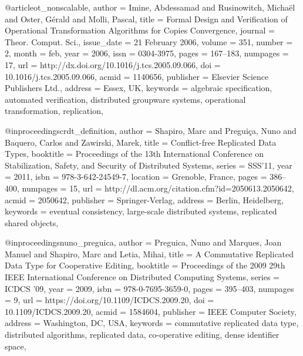 @article{ot_nonscalable,
 author = {Imine, Abdessamad and Rusinowitch, Micha\"{e}l and Oster, G{\'e}rald and Molli, Pascal},
 title = {Formal Design and Verification of Operational Transformation Algorithms for Copies Convergence},
 journal = {Theor. Comput. Sci.},
 issue_date = {21 February 2006},
 volume = {351},
 number = {2},
 month = feb,
 year = {2006},
 issn = {0304-3975},
 pages = {167--183},
 numpages = {17},
 url = {http://dx.doi.org/10.1016/j.tcs.2005.09.066},
 doi = {10.1016/j.tcs.2005.09.066},
 acmid = {1140656},
 publisher = {Elsevier Science Publishers Ltd.},
 address = {Essex, UK},
 keywords = {algebraic specification, automated verification, distributed groupware systems, operational transformation, replication},
}

@inproceedings{crdt_definition,
 author = {Shapiro, Marc and Pregui\c{c}a, Nuno and Baquero, Carlos and Zawirski, Marek},
 title = {Conflict-free Replicated Data Types},
 booktitle = {Proceedings of the 13th International Conference on Stabilization, Safety, and Security of Distributed Systems},
 series = {SSS'11},
 year = {2011},
 isbn = {978-3-642-24549-7},
 location = {Grenoble, France},
 pages = {386--400},
 numpages = {15},
 url = {http://dl.acm.org/citation.cfm?id=2050613.2050642},
 acmid = {2050642},
 publisher = {Springer-Verlag},
 address = {Berlin, Heidelberg},
 keywords = {eventual consistency, large-scale distributed systems, replicated shared objects},
} 

@inproceedings{nuno_preguica,
 author = {Preguica, Nuno and Marques, Joan Manuel and Shapiro, Marc and Letia, Mihai},
 title = {A Commutative Replicated Data Type for Cooperative Editing},
 booktitle = {Proceedings of the 2009 29th IEEE International Conference on Distributed Computing Systems},
 series = {ICDCS '09},
 year = {2009},
 isbn = {978-0-7695-3659-0},
 pages = {395--403},
 numpages = {9},
 url = {https://doi.org/10.1109/ICDCS.2009.20},
 doi = {10.1109/ICDCS.2009.20},
 acmid = {1584604},
 publisher = {IEEE Computer Society},
 address = {Washington, DC, USA},
 keywords = {commutative replicated data type, distributed algorithms, replicated data, co-operative editing, dense identifier space},
} 
